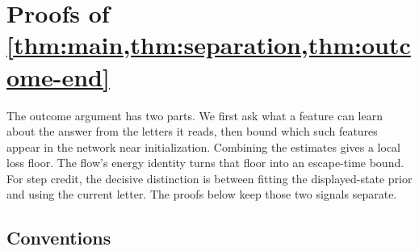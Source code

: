 \section{Proofs of \texorpdfstring{\cref{thm:main,thm:separation,thm:outcome-end}}{Theorems 1-3}}
\label{app:damping-proof}
\label{app:mainproofs}

The outcome argument has two parts. We first ask what a feature can learn about the answer from the letters it reads, then bound
which such features appear in the network near initialization. Combining the estimates gives a local loss floor. The flow's energy
identity turns that floor into an escape-time bound. For step credit, the decisive distinction is between fitting the displayed-state
prior and using the current letter. The proofs below keep those two signals separate.

\subsection{Conventions}
\label{app:assumptions}

\begin{table}[h]
\caption{Lemmas of \cref{app:mainproofs} and the theorems they feed.}
\label{tab:C-map}
\centering\small
{}
\end{table}


